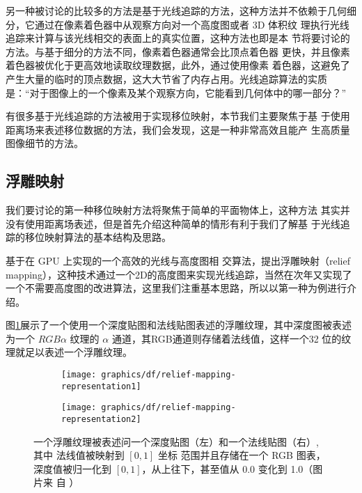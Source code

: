另一种被讨论的比较多的方法是基于光线追踪的方法，这种方法并不依赖于几何细分，它通过在像素着色器中从观察方向对一个高度图或者 3D 体积纹 理执行光线追踪来计算与该光线相交的表面上的真实位置，这种方法也即是本 节将要讨论的方法。与基于细分的方法不同，像素着色器通常会比顶点着色器 更快，并且像素着色器被优化于更高效地读取纹理数据，此外，通过使用像素 着色器，这避免了产生大量的临时的顶点数据，这大大节省了内存占用。光线追踪算法的实质是：“对于图像上的一个像素及某个观察方向，它能看到几何体中的哪一部分？”

有很多基于光线追踪的方法被用于实现移位映射，本节我们主要聚焦于基 于使用距离场来表述移位数据的方法，我们会发现，这是一种非常高效且能产 生高质量图像细节的方法。



\subsection{浮雕映射}
我们要讨论的第一种移位映射方法将聚焦于简单的平面物体上，这种方法 其实并没有使用距离场表述，但是首先介绍这种简单的情形有利于我们了解基 于光线追踪的移位映射算法的基本结构及思路。

\cite{a:Real-TimeReliefMappingonArbitraryPolygonalSurfaces}基于在 GPU 上实现的一个高效的光线与高度图相 交算法，提出浮雕映射（relief mapping），这种技术通过一个2D的高度图来实现光线追踪，当然在次年\cite{a:ReliefMappingofNo-Height-FieldSurfaceDetails}又实现了一个不需要高度图的改进算法，这里我们注重基本思路，所以以第一种为例进行介绍。

图\ref{f:df-relief-mapping-representation}展示了一个使用一个深度贴图和法线贴图表述的浮雕纹理，其中深度图被表述为一个 $RGB\alpha$ 纹理的 $\alpha$ 通道，其RGB通道则存储着法线值，这样一个32 位的纹理就足以表述一个浮雕纹理。

\begin{figure}
\sidecaption
{
	\begin{subfigure}[t]{0.31\textwidth}
		\texttt{[image: graphics/df/relief-mapping-representation1]}
	\end{subfigure}
	\begin{subfigure}[t]{0.31\textwidth}
		\texttt{[image: graphics/df/relief-mapping-representation2]}
	\end{subfigure}
}
	\caption{一个浮雕纹理被表述问一个深度贴图（左）和一个法线贴图（右）, 其中 法线值被映射到 $[0,1]$ 坐标 范围并且存储在一个 RGB 图表，深度值被归一化到 $[0,1]$，从上往下，甚至值从 0.0 变化到 1.0（图片来 自 \cite{a:Real-TimeReliefMappingonArbitraryPolygonalSurfaces}）}
	\label{f:df-relief-mapping-representation}
\end{figure}

